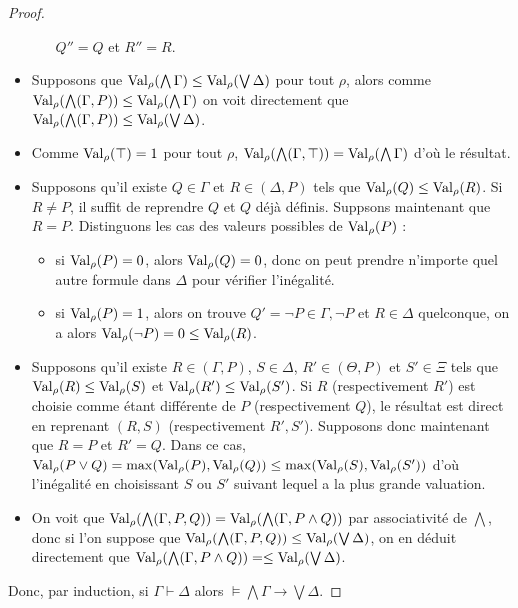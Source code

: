 \begin{proof}
\begin{itemize}
\begin{itemize}
      $Q'' = Q$ et $R'' = R$.
    \end{itemize}
  \item Supposons que
    $\operatorname{Val}_\rho(\bigwedge \Gamma) \leq \operatorname{Val}_\rho(\bigvee \Delta)$ pour tout
    $\rho$, alors comme
    $\operatorname{Val}_\rho(\bigwedge (\Gamma, P)) \leq \operatorname{Val}_\rho(\bigwedge \Gamma)$ on voit
    directement que
    $\operatorname{Val}_\rho(\bigwedge(\Gamma,P)) \leq \operatorname{Val}_\rho(\bigvee\Delta)$.
  \item Comme $\operatorname{Val}_\rho(\top) = 1$ pour tout $\rho$,
    $\operatorname{Val}_\rho(\bigwedge(\Gamma,\top)) = \operatorname{Val}_\rho(\bigwedge \Gamma)$ d'où le
    résultat.
  \item Supposons qu'il existe $Q\in\Gamma$ et $R\in(\Delta,P)$ tels que
    $\operatorname{Val}_\rho(Q)\leq\operatorname{Val}_\rho(R)$. Si $R \neq P$, il suffit de reprendre $Q$ et
    $Q$ déjà définis. Suppsons maintenant que $R = P$. Distinguons les cas des
    valeurs possibles de $\operatorname{Val}_\rho(P)$ :
    \begin{itemize}
    \item si $\operatorname{Val}_\rho(P) = 0$, alors $\operatorname{Val}_\rho(Q) = 0$, donc on peut prendre
      n'importe quel autre formule dans $\Delta$ pour vérifier l'inégalité.
    \item si $\operatorname{Val}_\rho(P) = 1$, alors on trouve
      $Q' = \lnot P \in \Gamma,\lnot P$ et $R\in \Delta$ quelconque, on a alors
      $\operatorname{Val}_\rho(\lnot P) = 0 \leq \operatorname{Val}_\rho(R)$.
    \end{itemize}
  \item Supposons qu'il existe $R\in(\Gamma,P)$, $S\in\Delta$, $R'\in(\Theta,P)$
    et $S'\in\Xi$ tels que $\operatorname{Val}_\rho(R)\leq\operatorname{Val}_\rho(S)$ et
    $\operatorname{Val}_\rho(R')\leq\operatorname{Val}_\rho(S')$. Si $R$ (respectivement $R'$) est choisie
    comme étant différente de $P$ (respectivement $Q$), le résultat est direct
    en reprenant $(R,S)$ (respectivement $R',S'$). Supposons donc maintenant que
    $R = P$ et $R' = Q$. Dans ce cas,
    $\operatorname{Val}_\rho(P\lor Q) = \max(\operatorname{Val}_\rho(P),\operatorname{Val}_\rho(Q)) \leq \max(\operatorname{Val}_\rho(S),
    \operatorname{Val}_\rho(S'))$ d'où l'inégalité en choisissant $S$ ou $S'$ suivant lequel
    a la plus grande valuation.
  \item On voit que
    $\operatorname{Val}_\rho(\bigwedge(\Gamma,P,Q)) = \operatorname{Val}_\rho(\bigwedge(\Gamma, P \land Q))$
    par associativité de $\bigwedge$, donc si l'on suppose que
    $\operatorname{Val}_\rho(\bigwedge(\Gamma,P,Q)) \leq \operatorname{Val}_\rho(\bigvee\Delta)$, on en
    déduit directement que
    $\operatorname{Val}_\rho(\bigwedge(\Gamma,P\land Q)) = \leq\operatorname{Val}_\rho(\bigvee\Delta)$.
  \end{itemize}
  Donc, par induction, si $\Gamma\vdash \Delta$ alors
  $\models \bigwedge\Gamma\to\bigvee\Delta$.
\end{proof}

